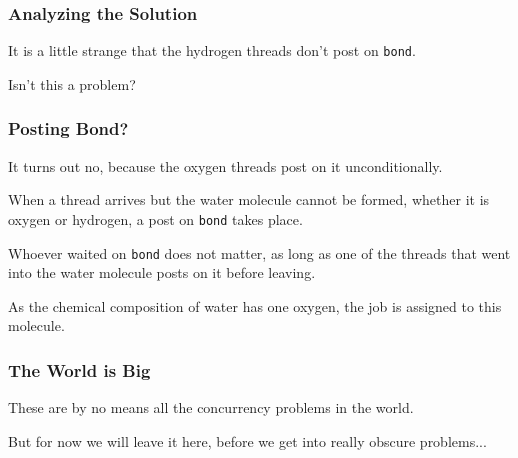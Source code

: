 \begin{frame}
	\frametitle{Analyzing the Solution}


	It is a little strange that the hydrogen threads don't post on \texttt{bond}.

	Isn't this a problem?

\end{frame}


\begin{frame}
	\frametitle{Posting Bond?}

	It turns out no, because the oxygen threads post on it unconditionally.

	When a thread arrives but the water molecule cannot be formed, whether it is oxygen or hydrogen, a post on \texttt{bond} takes place.

	Whoever waited on \texttt{bond} does not matter, as long as one of the threads that went into the water molecule posts on it before leaving.

	As the chemical composition of water has one oxygen, the job is assigned to this molecule.

\end{frame}



\begin{frame}
	\frametitle{The World is Big}

	These are by no means all the concurrency problems in the world.

	But for now we will leave it here, before  we get into really obscure problems...

\end{frame}



